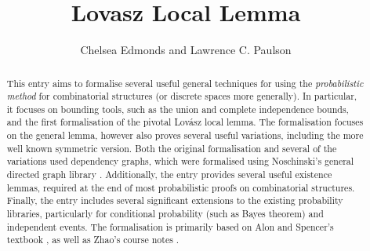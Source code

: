 \documentclass[11pt,a4paper]{article}
\begin{document}
\title{Lovasz Local Lemma}
\author{Chelsea Edmonds and Lawrence C. Paulson}
\maketitle

\begin{abstract}
  This entry aims to formalise several useful general techniques for using the \textit{probabilistic method} for combinatorial structures (or discrete spaces more generally). In particular, it focuses on bounding tools, such as the union and complete independence bounds, and the first formalisation of the pivotal Lov\'asz local lemma. The formalisation focuses on the general lemma, however also proves several useful variations, including the more well known symmetric version. Both the original formalisation and several of the variations used dependency graphs, which were formalised using Noschinski's general directed graph library \cite{noschinskiGraphLibrary2015}. Additionally, the entry provides several useful existence lemmas, required at the end of most probabilistic proofs on combinatorial structures. Finally, the entry includes several significant extensions to the existing probability libraries, particularly for conditional probability (such as Bayes theorem) and independent events. The formalisation is primarily based on Alon and Spencer's textbook \cite{alonProbabilisticMethod2008}, as well as Zhao's course notes \cite{Zhaonotes}. 
\end{abstract}

\tableofcontents





\end{document}
